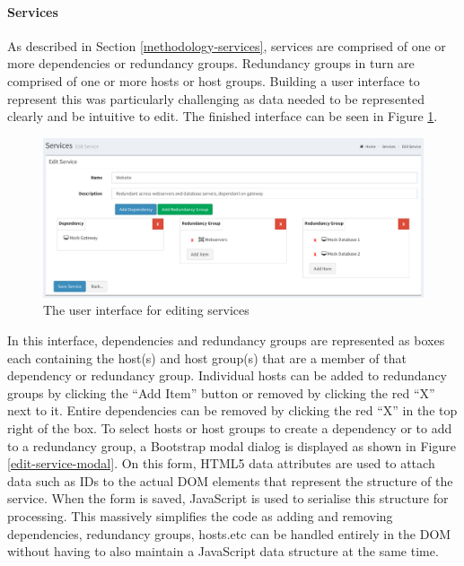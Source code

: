 \documentclass[bsc,logo,twoside,parskip,singlespacing,notimes]{infthesis}
\begin{document}
\paragraph*{Services}
	As described in Section \ref{methodology-services}, services are comprised of
	one or more dependencies or redundancy groups.  Redundancy groups in turn are
	comprised of one or more hosts or host groups.  Building a user interface to
	represent this was particularly challenging as data needed to be represented
	clearly and be intuitive to edit.  The finished interface can be seen in
	Figure \ref{edit-service}.

\begin{figure}[H]
	\centering
	\caption{The user interface for editing services}
	\label{edit-service}
	\includegraphics[scale=0.44]{assets/screenshots/edit-service.pdf}
\end{figure}


	In this interface, dependencies and redundancy groups are represented as boxes
	each containing the host(s) and host group(s) that are a member of that
	dependency or redundancy group.  Individual hosts can be added to redundancy
	groups by clicking the ``Add Item'' button or removed by clicking the red ``X''
	next to it.  Entire dependencies can be removed by clicking the red ``X'' in the
	top right of the box.  To select hosts or host groups to create a dependency
	or to add to a redundancy group, a Bootstrap modal dialog is displayed as
	shown in Figure \ref{edit-service-modal}.  On this form, HTML5 data attributes
	are used to attach data such as IDs to the actual DOM elements that represent
	the structure of the service.  When the form is saved, JavaScript is used to
	serialise this structure for processing.  This massively simplifies the code
	as adding and removing dependencies, redundancy groups, hosts.etc can be
	handled entirely in the DOM without having to also maintain a JavaScript data
	structure at the same time.
\end{document}
